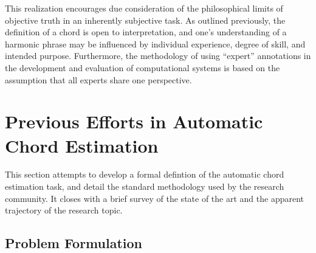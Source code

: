
This realization encourages due consideration of the philosophical limits of objective truth in an inherently subjective task.
As outlined previously, the definition of a chord is open to interpretation, and one's understanding of a harmonic phrase may be influenced by individual experience, degree of skill, and intended purpose.
Furthermore, the methodology of using ``expert'' annotations in the development and evaluation of computational systems is based on the assumption that all experts share one perspective.


\section{Previous Efforts in Automatic Chord Estimation}
\label{sec:background}

This section attempts to develop a formal defintion of the automatic chord estimation task, and detail the standard methodology used by the research community.
It closes with a brief survey of the state of the art and the apparent trajectory of the research topic.


\subsection{Problem Formulation}
\label{subsec:problem_formulation}

